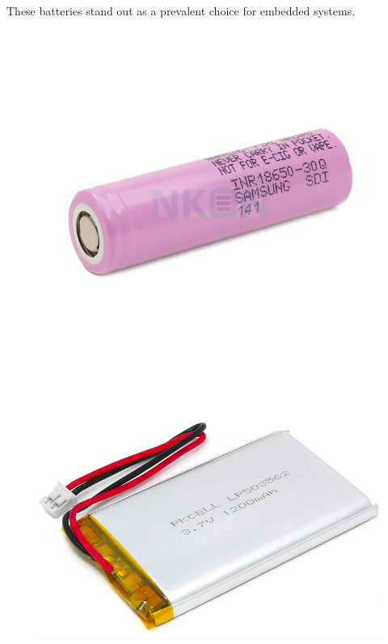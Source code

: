 These batteries stand out as a prevalent choice for embedded systems.
\begin{figure}[H]
    \centering
    \begin{minipage}{.5\textwidth}
        \centering
        \includegraphics[width=.5\linewidth]{ch4/assets/18650.jpg}
        \label{fig:18650}
    \end{minipage}%
    \begin{minipage}{.5\textwidth}
        \centering
        \includegraphics[width=.5\linewidth]{ch4/assets/lipo.png}
        \label{fig:lipo}
    \end{minipage}
\end{figure}

